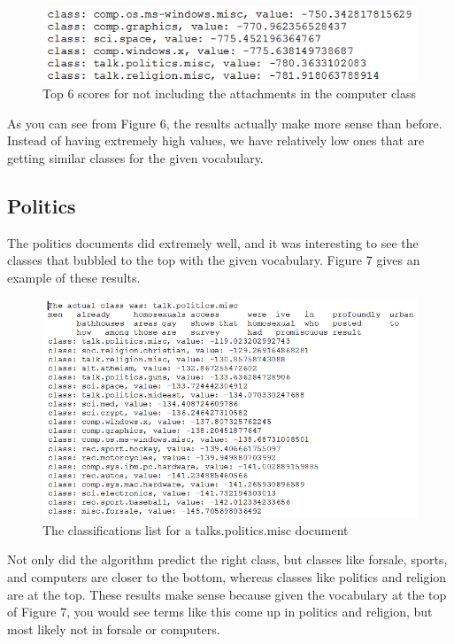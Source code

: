 \documentclass[11pt]{article}
\begin{document}
\begin{figure}[h!]
\begin{center}
\includegraphics[scale=.8]{withoutattachscore.png}
\caption{Top 6 scores for not including the attachments in the computer class}
\end{center}
\end{figure}
\newline
As you can see from Figure 6, the results actually make more sense than before.  Instead of having extremely high values, we have relatively low ones that are getting similar classes for the given vocabulary.
\subsection{Politics}
The politics documents did extremely well, and it was interesting to see the classes that bubbled to the top with the given vocabulary.  Figure 7 gives an example of these results.
\newpage
\begin{figure}[ht]
\begin{center}
\includegraphics[scale=.8]{talkspolitics.png}
\caption{The classifications list for a talks.politics.misc document}
\end{center}
\end{figure}
\noindent
Not only did the algorithm predict the right class, but classes like forsale, sports, and computers are closer to the bottom, whereas classes like politics and religion are at the top.  These results make sense because given the vocabulary at the top of Figure 7, you would see terms like this come up in politics and religion, but most likely not in forsale or computers.
\end{document}
